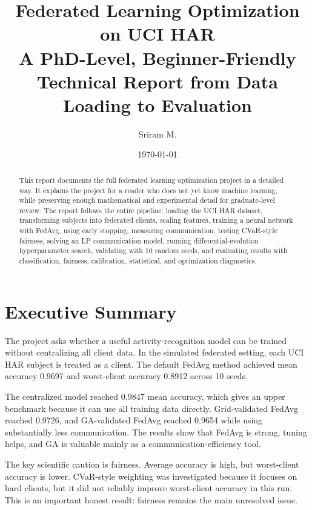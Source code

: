 \documentclass[11pt]{report}
\title{\textbf{Federated Learning Optimization on UCI HAR}\\\large A PhD-Level, Beginner-Friendly Technical Report from Data Loading to Evaluation}
\author{Sriram M.}
\date{\today}
\begin{document}
\maketitle
\begin{abstract}
This report documents the full federated learning optimization project in a detailed way. It
explains the project for a reader who does not yet know machine learning, while preserving enough
mathematical and experimental detail for graduate-level review. The report follows the entire
pipeline: loading the UCI HAR dataset, transforming subjects into federated clients, scaling
features, training a neural network with FedAvg, using early stopping, measuring communication,
testing CVaR-style fairness, solving an LP communication model, running differential-evolution
hyperparameter search, validating with 10 random seeds, and evaluating results with classification,
fairness, calibration, statistical, and optimization diagnostics.
\end{abstract}
\tableofcontents
\listoffigures
\listoftables
\chapter{Executive Summary}
The project asks whether a useful activity-recognition model can be trained without centralizing all
client data. In the simulated federated setting, each UCI HAR subject is treated as a client. The
default FedAvg method achieved mean accuracy 0.9697 and worst-client accuracy 0.8912 across 10
seeds.

The centralized model reached 0.9847 mean accuracy, which gives an upper benchmark because it can
use all training data directly. Grid-validated FedAvg reached 0.9726, and GA-validated FedAvg
reached 0.9654 while using substantially less communication. The results show that FedAvg is strong,
tuning helps, and GA is valuable mainly as a communication-efficiency tool.

The key scientific caution is fairness. Average accuracy is high, but worst-client accuracy is
lower. CVaR-style weighting was investigated because it focuses on hard clients, but it did not
reliably improve worst-client accuracy in this run. This is an important honest result: fairness
remains the main unresolved issue.
\end{document}
